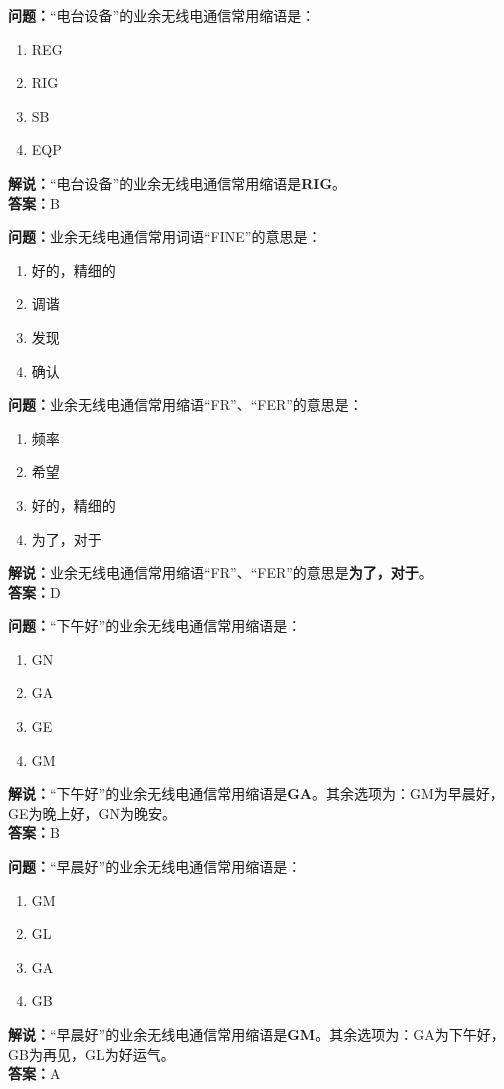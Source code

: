 \bigskip


\noindent\textbf{问题：}“电台设备”的业余无线电通信常用缩语是：
\begin{enumerate}[label=\Alph*), leftmargin=3em]
\item REG
\item RIG
\item SB
\item EQP
\end{enumerate}
\noindent\textbf{解说：}“电台设备”的业余无线电通信常用缩语是\textbf{RIG}。\\\noindent\textbf{答案：}B

\bigskip


\noindent\textbf{问题：}业余无线电通信常用词语“FINE”的意思是：
\begin{enumerate}[label=\Alph*), leftmargin=3em]
\item 好的，精细的
\item 调谐
\item 发现
\item 确认
\end{enumerate}

\bigskip


\noindent\textbf{问题：}业余无线电通信常用缩语“FR”、“FER”的意思是：
\begin{enumerate}[label=\Alph*), leftmargin=3em]
\item 频率
\item 希望
\item 好的，精细的
\item 为了，对于
\end{enumerate}
\noindent\textbf{解说：}业余无线电通信常用缩语“FR”、“FER”的意思是\textbf{为了，对于}。\\\noindent\textbf{答案：}D


\bigskip


\noindent\textbf{问题：}“下午好”的业余无线电通信常用缩语是：
\begin{enumerate}[label=\Alph*), leftmargin=3em]
\item GN
\item GA
\item GE
\item GM
\end{enumerate}
\noindent\textbf{解说：}“下午好”的业余无线电通信常用缩语是\textbf{GA}。其余选项为：GM为早晨好，GE为晚上好，GN为晚安。\\\noindent\textbf{答案：}B

\bigskip


\noindent\textbf{问题：}“早晨好”的业余无线电通信常用缩语是：
\begin{enumerate}[label=\Alph*), leftmargin=3em]
\item GM
\item GL
\item GA
\item GB
\end{enumerate}
\noindent\textbf{解说：}“早晨好”的业余无线电通信常用缩语是\textbf{GM}。其余选项为：GA为下午好，GB为再见，GL为好运气。\\\noindent\textbf{答案：}A


